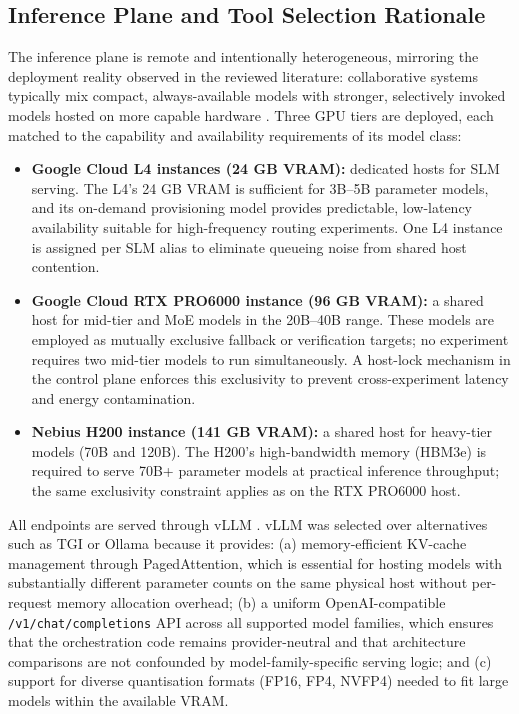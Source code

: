 \subsection{Inference Plane and Tool Selection Rationale}

The inference plane is remote and intentionally heterogeneous, mirroring the deployment reality observed in the reviewed literature: collaborative systems typically mix compact, always-available models with stronger, selectively invoked models hosted on more capable hardware \cite{hao2024hybrid, oh2025uncertainty, shao2025dot}. Three GPU tiers are deployed, each matched to the capability and availability requirements of its model class:

\begin{itemize}
    \item \textbf{Google Cloud L4 instances (24 GB VRAM):} dedicated hosts for SLM serving. The L4's 24 GB VRAM is sufficient for 3B--5B parameter models, and its on-demand provisioning model provides predictable, low-latency availability suitable for high-frequency routing experiments. One L4 instance is assigned per SLM alias to eliminate queueing noise from shared host contention.
    \item \textbf{Google Cloud RTX PRO6000 instance (96 GB VRAM):} a shared host for mid-tier and MoE models in the 20B--40B range. These models are employed as mutually exclusive fallback or verification targets; no experiment requires two mid-tier models to run simultaneously. A host-lock mechanism in the control plane enforces this exclusivity to prevent cross-experiment latency and energy contamination.
    \item \textbf{Nebius H200 instance (141 GB VRAM):} a shared host for heavy-tier models (70B and 120B). The H200's high-bandwidth memory (HBM3e) is required to serve 70B+ parameter models at practical inference throughput; the same exclusivity constraint applies as on the RTX PRO6000 host.
\end{itemize}

All endpoints are served through vLLM \cite{kwon2023vllm}. vLLM was selected over alternatives such as TGI or Ollama because it provides: (a) memory-efficient KV-cache management through PagedAttention, which is essential for hosting models with substantially different parameter counts on the same physical host without per-request memory allocation overhead; (b) a uniform OpenAI-compatible \texttt{/v1/chat/completions} API across all supported model families, which ensures that the orchestration code remains provider-neutral and that architecture comparisons are not confounded by model-family-specific serving logic; and (c) support for diverse quantisation formats (FP16, FP4, NVFP4) needed to fit large models within the available VRAM.

